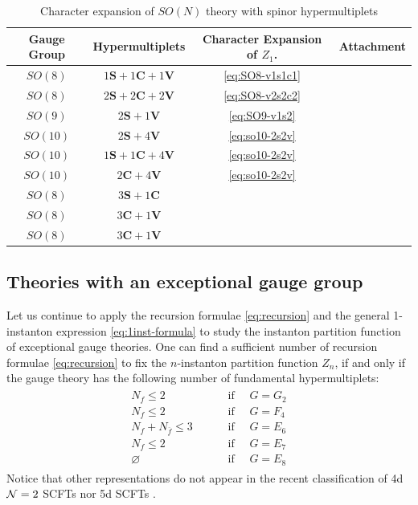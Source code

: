 \documentclass[letterpaper, 11pt]{article}
\def\CN{{\cal N}}
\begin{document}
{\begin{table}[h!]
  \centering
  \begin{tabular}{cc|cc}
    Gauge Group & Hypermultiplets & Character Expansion of $Z_1$. & Attachment \\\hline\hline 
    $SO(8)$ & $1\mathbf{S}+1\mathbf{C}+1\mathbf{V}$ & \eqref{eq:SO8-v1s1c1}\\
    $SO(8)$ & $2\mathbf{S}+2\mathbf{C}+2\mathbf{V}$ & \eqref{eq:SO8-v2s2c2}\\
    $SO(9)$ & $2\mathbf{S}+1\mathbf{V}$ & \eqref{eq:SO9-v1s2}\\
    $SO(10)$ & $2\mathbf{S}+4\mathbf{V}$ & \eqref{eq:so10-2s2v}\\
    $SO(10)$ & $1\mathbf{S}+1\mathbf{C}+4\mathbf{V}$ & \eqref{eq:so10-2s2v}\\
    $SO(10)$ & $2\mathbf{C}+4\mathbf{V}$ & \eqref{eq:so10-2s2v}\\\hline
    $SO(8)$ & $3\mathbf{S}+1\mathbf{C}$ & \\
    $SO(8)$ & $3\mathbf{C}+1\mathbf{V}$ & \\
    $SO(8)$ & $3\mathbf{C}+1\mathbf{V}$ & \\
  \end{tabular}
  \caption{Character expansion of $SO(N)$ theory with spinor hypermultiplets}
  \label{tbl:son-data}
\end{table}


\subsection{Theories with an exceptional gauge group}
\label{subsec:exceptional}


Let us continue to apply the recursion formulae \eqref{eq:recursion} and the general 1-instanton expression \eqref{eq:1inst-formula} to study the instanton partition function of exceptional gauge theories. One can find a sufficient number of recursion formulae \eqref{eq:recursion} to fix the $n$-instanton partition function $Z_n$, if and only if the gauge theory has the following number of fundamental hypermultiplets: 
\begin{align}
  \label{eq:exceptional-range}
  \begin{split}
    N_{f} \leq 2 & \qquad\text{ if }\quad G=G_2\\
    N_{f} \leq 2 & \qquad\text{ if }\quad G=F_4\\
    N_{f}+N_{\overline{f}} \leq 3 & \qquad\text{ if }\quad G=E_6\\
    N_{f} \leq 2 & \qquad\text{ if }\quad G=E_7\\
    \varnothing & \qquad\text{ if }\quad G=E_8
  \end{split}
\end{align}
Notice that other representations do not appear in the recent classification of 4d $\CN=2$ SCFTs \cite{Bhardwaj:2013qia} nor 5d SCFTs \cite{Jefferson:2017ahm}.

}
\end{document}

